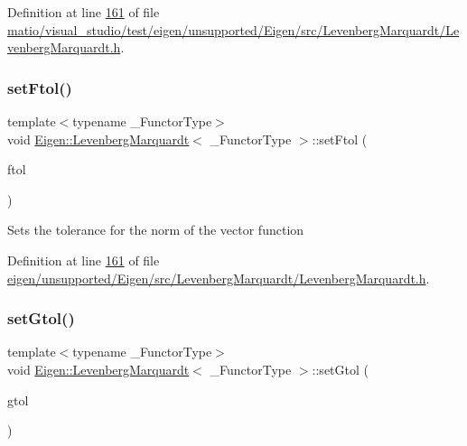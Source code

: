 Definition at line \hyperlink{matio_2visual__studio_2test_2eigen_2unsupported_2_eigen_2src_2_levenberg_marquardt_2_levenberg_marquardt_8h_source_l00161}{161} of file \hyperlink{matio_2visual__studio_2test_2eigen_2unsupported_2_eigen_2src_2_levenberg_marquardt_2_levenberg_marquardt_8h_source}{matio/visual\+\_\+studio/test/eigen/unsupported/\+Eigen/src/\+Levenberg\+Marquardt/\+Levenberg\+Marquardt.\+h}.

\mbox{\label{class_eigen_1_1_levenberg_marquardt_a09c0852c6a4534b84a16ac5d9c631c12}} 
\subsubsection{\texorpdfstring{set\+Ftol()}{setFtol()}\hspace{0.1cm}{\footnotesize\ttfamily [2/2]}}
{\footnotesize\ttfamily template$<$typename \+\_\+\+Functor\+Type$>$ \\
void \hyperlink{class_eigen_1_1_levenberg_marquardt}{Eigen\+::\+Levenberg\+Marquardt}$<$ \+\_\+\+Functor\+Type $>$\+::set\+Ftol (\begin{DoxyParamCaption}\item[{Real\+Scalar}]{ftol }\end{DoxyParamCaption})\hspace{0.3cm}{\ttfamily [inline]}}

Sets the tolerance for the norm of the vector function 

Definition at line \hyperlink{eigen_2unsupported_2_eigen_2src_2_levenberg_marquardt_2_levenberg_marquardt_8h_source_l00161}{161} of file \hyperlink{eigen_2unsupported_2_eigen_2src_2_levenberg_marquardt_2_levenberg_marquardt_8h_source}{eigen/unsupported/\+Eigen/src/\+Levenberg\+Marquardt/\+Levenberg\+Marquardt.\+h}.

\mbox{\label{class_eigen_1_1_levenberg_marquardt_ad5610b2353f1ce5e0c7357ed1b215fea}} 
\subsubsection{\texorpdfstring{set\+Gtol()}{setGtol()}\hspace{0.1cm}{\footnotesize\ttfamily [1/2]}}
{\footnotesize\ttfamily template$<$typename \+\_\+\+Functor\+Type$>$ \\
void \hyperlink{class_eigen_1_1_levenberg_marquardt}{Eigen\+::\+Levenberg\+Marquardt}$<$ \+\_\+\+Functor\+Type $>$\+::set\+Gtol (\begin{DoxyParamCaption}\item[{Real\+Scalar}]{gtol }\end{DoxyParamCaption})\hspace{0.3cm}{\ttfamily [inline]}}

